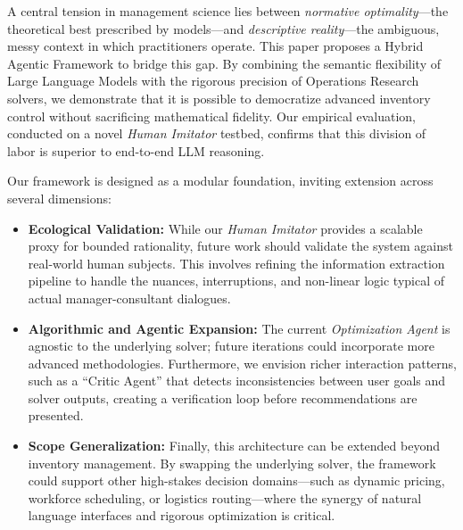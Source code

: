 A central tension in management science lies between \emph{normative optimality}—the theoretical best prescribed by models—and \emph{descriptive reality}—the ambiguous, messy context in which practitioners operate. This paper proposes a Hybrid Agentic Framework to bridge this gap. By combining the semantic flexibility of Large Language Models with the rigorous precision of Operations Research solvers, we demonstrate that it is possible to democratize advanced inventory control without sacrificing mathematical fidelity.
Our empirical evaluation, conducted on a novel \emph{Human Imitator} testbed, confirms that this division of labor is superior to end-to-end LLM reasoning.


Our framework is designed as a modular foundation, inviting extension across several dimensions:

\begin{itemize}\item \textbf{Ecological Validation:} While our \emph{Human Imitator} provides a scalable proxy for bounded rationality, future work should validate the system against real-world human subjects. This involves refining the information extraction pipeline to handle the nuances, interruptions, and non-linear logic typical of actual manager-consultant dialogues.\item \textbf{Algorithmic and Agentic Expansion:} The current \emph{Optimization Agent} is agnostic to the underlying solver; future iterations could incorporate more advanced methodologies. Furthermore, we envision richer interaction patterns, such as a ``Critic Agent'' that detects inconsistencies between user goals and solver outputs, creating a verification loop before recommendations are presented.

\item \textbf{Scope Generalization:} Finally, this architecture can be extended beyond inventory management. By swapping the underlying solver, the framework could support other high-stakes decision domains—such as dynamic pricing, workforce scheduling, or logistics routing—where the synergy of natural language interfaces and rigorous optimization is critical.
\end{itemize}
